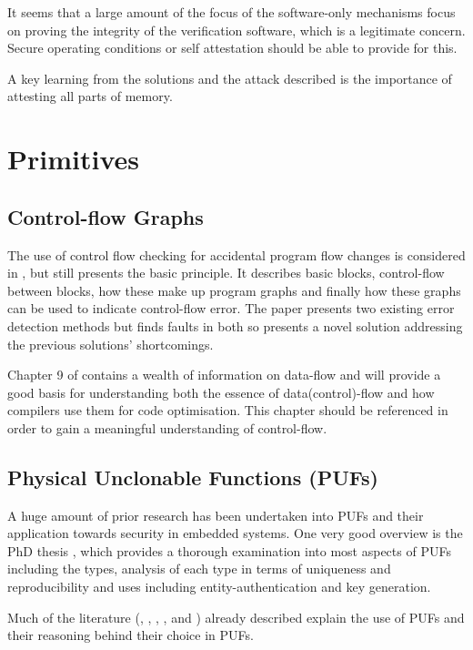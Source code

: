 It seems that a large amount of the focus of the software-only mechanisms focus on proving the integrity of the verification software, which is a legitimate concern. Secure operating conditions or self attestation should  be able to provide for this.

A key learning from the solutions and the attack described is the importance of attesting all parts of memory.

\section{Primitives}

\subsection{Control-flow Graphs}

The use of control flow checking for accidental program flow changes is considered in \cite{Goloubeva2003}, but still presents the basic principle. It describes basic blocks, control-flow between blocks, how these make up program graphs and finally how these graphs can be used to indicate control-flow error. The paper presents two existing error detection methods but finds faults in both so presents a novel solution addressing the previous solutions' shortcomings.

Chapter 9 of \cite{AhoAlfredV.2014C:pt} contains a wealth of information on data-flow and will provide a good basis for understanding both the essence of data(control)-flow and how compilers use them for code optimisation. This chapter should be referenced in order to gain a meaningful understanding of control-flow.


\subsection{Physical Unclonable Functions (PUFs)}\label{PUFExplaination}

A huge amount of prior research has been undertaken into PUFs and their application towards security in embedded systems. One very good overview is the PhD thesis \cite{Maes2012}, which provides a thorough examination into most aspects of PUFs including the types, analysis of each type in terms of uniqueness and reproducibility and uses including entity-authentication and key generation.

Much of the literature (\cite{Lee2016}, \cite{Schaller2014}, \cite{Kleber2015}, \cite{Kohnhauser2015}, \cite{Gora2010} and \cite{Simpson2006}) already described explain the use of PUFs and their reasoning behind their choice in PUFs.

